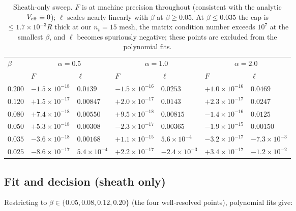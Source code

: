 \documentclass[11pt]{article}
\begin{document}
\begin{table}[h]
\centering
\begin{tabular}{l|ll|ll|ll}\toprule
$\beta$ & \multicolumn{2}{c|}{$\alpha=0.5$} &
         \multicolumn{2}{c|}{$\alpha=1.0$} &
         \multicolumn{2}{c}{$\alpha=2.0$} \\
        & $F$ & $\ell$ & $F$ & $\ell$ & $F$ & $\ell$ \\\midrule
$0.200$ & $-1.5\!\times\!10^{-18}$ & $0.0139$ & $-1.5\!\times\!10^{-16}$ & $0.0253$ & $+1.0\!\times\!10^{-16}$ & $0.0469$ \\
$0.120$ & $+1.5\!\times\!10^{-17}$ & $0.00847$ & $+2.0\!\times\!10^{-17}$ & $0.0143$ & $+2.3\!\times\!10^{-17}$ & $0.0247$ \\
$0.080$ & $+7.4\!\times\!10^{-18}$ & $0.00550$ & $+9.5\!\times\!10^{-18}$ & $0.00815$ & $-1.4\!\times\!10^{-16}$ & $0.0125$ \\
$0.050$ & $+5.3\!\times\!10^{-18}$ & $0.00308$ & $-2.3\!\times\!10^{-17}$ & $0.00365$ & $-1.9\!\times\!10^{-15}$ & $0.00150$ \\
$0.035$ & $-3.6\!\times\!10^{-18}$ & $0.00168$ & $+1.1\!\times\!10^{-15}$ & $5.6\!\times\!10^{-4}$ & $-3.2\!\times\!10^{-17}$ & $-7.3\!\times\!10^{-3}$ \\
$0.025$ & $-8.6\!\times\!10^{-17}$ & $5.4\!\times\!10^{-4}$ & $+2.2\!\times\!10^{-17}$ & $-2.4\!\times\!10^{-3}$ & $+3.4\!\times\!10^{-17}$ & $-1.2\!\times\!10^{-2}$ \\\bottomrule
\end{tabular}
\caption{Sheath-only sweep.  $F$ is at machine precision throughout
(consistent with the analytic $V_{\rm eff}\equiv 0$); $\ell$ scales
nearly linearly with $\beta$ at $\beta\ge 0.05$.  At $\beta\le 0.035$
the cap is $\le 1.7\times 10^{-3} R$ thick at our $n_t\!=\!15$ mesh,
the matrix condition number exceeds $10^7$ at the smallest $\beta$,
and $\ell$ becomes spuriously negative; these points are excluded
from the polynomial fits.}
\label{tab:sweep-no-wire}
\end{table}

\subsection{Fit and decision (sheath only)}

Restricting to $\beta\in\{0.05,0.08,0.12,0.20\}$ (the four
well-resolved points), polynomial fits give:
\end{document}
